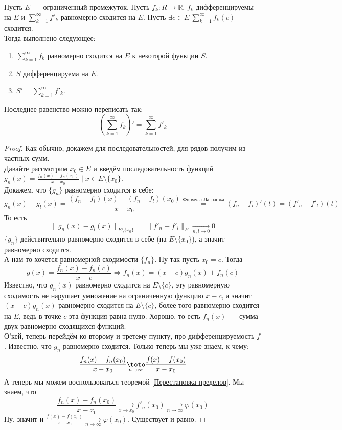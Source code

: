 \documentclass{article}
\begin{document}
    \begin{theorem}
        Пусть $E$~--- ограниченный промежуток. Пусть $f_k\colon R\to\mathbb R$, $f_k$ дифференцируемы на $E$ и $\sum\limits_{k=1}^\infty f'_k$ равномерно сходится на $E$. Пусть $\exists c\in E~\sum\limits_{k=1}^\infty f_k(c)$ сходится.\\
        Тогда выполнено следующее:
        \begin{enumerate}
            \item $\sum\limits_{k=1}^\infty f_k$ равномерно сходится на $E$ к некоторой функции $S$.
            \item $S$ дифференцируема на $E$.
            \item $S'=\sum\limits_{k=1}^\infty f'_k$.
        \end{enumerate}
        Последнее равенство можно переписать так:
        $$
        \left(\sum\limits_{k=1}^\infty f_k\right)'=\sum\limits_{k=1}^\infty f'_k
        $$
    \end{theorem}
    \begin{proof}
        Как обычно, докажем для последовательностей, для рядов получим из частных сумм.\\
        Давайте рассмотрим $x_0\in E$ и введём последовательность функций $g_n(x)=\frac{f_n(x)-f_n(x_0)}{x-x_0}\mid x\in E\setminus\{x_0\}$.\\
        Докажем, что $\{g_n\}$ равномерно сходится в себе:
        $$
            g_n(x)-g_l(x)=\frac{(f_n-f_l)(x)-(f_n-f_l)(x_0)}{x-x_0}\overset{\text{Формула Лагранжа}}=(f_n-f_l)'(t)=(f'_n-f'_l)(t)
        $$
        То есть
        $$
        \|g_n(x)-g_l(x)\|_{E\setminus\{x_0\}}=\|f'_n-f'_l\|_{E}\underset{n,l\to0}\longrightarrow0
        $$
        $\{g_n\}$ действительно равномерно сходится в себе (на $E\setminus\{x_0\}$), а значит равномерно сходится.\\
        А нам-то хочется равномерной сходимости $\{f_n\}$. Ну так пусть $x_0=c$. Тогда
        $$
        g(x)=\frac{f_n(x)-f_n(c)}{x-c}\Rightarrow f_n(x)=(x-c)g_n(x)+f_n(c)
        $$
        Известно, что $g_n(x)$ равномерно сходится на $E\setminus\{c\}$, эту равномерную сходимость \hyperref[Произведение равномерно сходящейся на ограниченную]{не нарушает} умножение на ограниченную функцию $x-c$, а значит $(x-c)g_n(x)$ равномерно сходится на $E\setminus\{c\}$, более того равномерно сходится на $E$, ведь в точке $c$ эта функция равна нулю. Хорошо, то есть $f_n(x)$~--- сумма двух равномерно сходящихся функций.\\
        О'кей, теперь перейдём ко второму и третему пункту, про дифференцируемость $f$. Известно, что $g_n$ равномерно сходится. Только теперь мы уже знаем, к чему:
        $$
        \frac{f_n(x)-f_n(x_0)}{x-x_0}\underset{n\to\infty}\toto\frac{f(x)-f(x_0)}{x-x_0}
        $$
        А теперь мы можем воспользоваться теоремой \ref{Перестановка пределов}. Мы знаем, что
        $$
        \frac{f_n(x)-f_n(x_0)}{x-x_0}\underset{x\to x_0}\longrightarrow f'_n(x_0)\underset{n\to\infty}\longrightarrow\varphi(x_0)
        $$
        Ну, значит и $\frac{f(x)-f(x_0)}{x-x_0}\underset{n\to\infty}\longrightarrow\varphi(x_0)$. Существует и равно.
    \end{proof}
\end{document}

